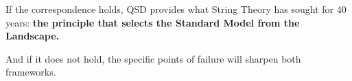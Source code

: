 \documentclass[11pt,a4paper]{article}
\theoremstyle{definition}
\begin{document}
If the correspondence holds, QSD provides what String Theory has sought
for 40 years: \textbf{the principle that selects the Standard Model from
the Landscape.}

And if it does not hold, the specific points of failure will sharpen
both frameworks.




\end{document}
